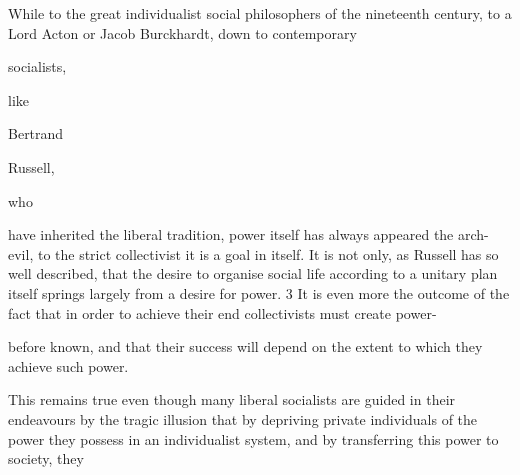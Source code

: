 \documentclass[11pt,openany]{book}
\begin{document}
\begin{center}\textasteriskcentered\hspace{0.9em}\textasteriskcentered\hspace{0.9em}\textasteriskcentered\end{center}

While to the great individualist social philosophers of the nineteenth century, to a Lord Acton or Jacob Burckhardt, down to contemporary

socialists,

like

Bertrand

Russell,

who

have inherited the liberal tradition, power itself has always appeared the arch-evil, to the strict collectivist it is a goal in itself. It is not only, as Russell has so well described, that the desire to organise social life according to a unitary plan itself springs largely from a desire for power. 3 It is even more the outcome of the fact that in order to achieve their end collectivists must create power-

before known, and that their success will depend on the extent to which they achieve such power.

This remains true even though many liberal socialists are guided in their endeavours by the tragic illusion that by depriving private individuals of the power they possess in an individualist system, and by transferring this power to society, they
\end{document}
